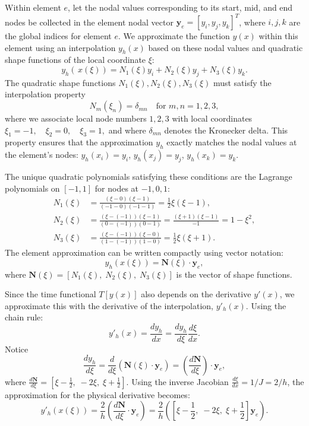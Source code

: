 \documentclass[11pt]{article}
\begin{document}
    Within element \(e\), let the nodal values corresponding to its start, mid, and end nodes be collected in the element nodal vector \( \mathbf{y}_{e} = \left[y_{i}, y_{j}, y_k\right]^{T}\), where \(i, j, k\) are the global indices for element \(e\). We approximate the function \( y(x) \) within this element using an interpolation \( y_h (x) \) based on these nodal values and quadratic shape functions of the local coordinate \( \xi \):
    \[
        y_h \left(\,x(\xi) \right) =  N_{1}(\xi) y_{i} + N_{2}(\xi) y_{j} + N_{3}(\xi) y_k.
    \]
    The quadratic shape functions \( N_1(\xi), N_2(\xi), N_3(\xi) \) must satisfy the interpolation property
    \[
        N_m(\xi_n) = \delta_{mn} \quad \text{for } m, n = 1, 2, 3,
    \]
    where we associate local node numbers $1, 2, 3$ with local coordinates
    \( \xi_1 = -1, \quad \xi_2 = 0, \quad \xi_3 = 1, \)
    and where \(\delta_{mn}\) denotes the Kronecker delta. This property ensures that the approximation \(y_h\) exactly matches the nodal values at the element's nodes: \( y_h(x_i) = y_i\), \( y_h(x_j) = y_j\), \( y_h(x_k) = y_k \).
    
    The unique quadratic polynomials satisfying these conditions are the Lagrange polynomials on \([-1, 1]\) for nodes at \(-1, 0, 1\):
    \[
    \begin{aligned}
        N_1(\xi) &= \frac{(\xi - 0)(\xi - 1)}{(-1 - 0)(-1 - 1)} = \frac{1}{2}\xi(\xi-1), \\
        N_2(\xi) &= \frac{(\xi - (-1))(\xi - 1)}{(0 - (-1))(0 - 1)} = \frac{(\xi+1)(\xi-1)}{-1} = 1 - \xi^2 ,\\
        N_3(\xi) &= \frac{(\xi - (-1))(\xi - 0)}{(1 - (-1))(1 - 0)} = \frac{1}{2}\xi(\xi+1).
    \end{aligned}
    \]
    The element approximation can be written compactly using vector notation:
    \begin{equation}
        y_h\left(x(\xi)\right) = \mathbf{N}(\xi) \cdot \mathbf{y}_e, \label{eq:yh}
    \end{equation}
    where \( \mathbf{N}(\xi) = [N_1(\xi), \; N_2(\xi), \; N_3(\xi)] \) is the vector of shape functions.
    
    Since the time functional \( T[y(x)] \) also depends on the derivative \( y'(x) \), we approximate this with the derivative of the interpolation, \( y'_h (x) \). Using the chain rule:
    \begin{equation*}
        y'_h (x) = \frac{dy_h}{dx}  = \frac{dy_h}{d\xi} \frac{d\xi}{dx}. 
    \end{equation*}
    Notice
    \[
        \frac{dy_h}{d\xi} = \frac{d}{d\xi} (\mathbf{N}(\xi) \cdot \mathbf{y}_e) = \left( \frac{d\mathbf{N}}{d\xi} \right) \cdot \mathbf{y}_e,
    \]
    where \( \frac{d\mathbf{N}}{d\xi} = \left[ \xi - \frac{1}{2},\; -2\xi,\; \xi + \frac{1}{2} \right] \).
    Using the inverse Jacobian \( \frac{d\xi}{dx} = 1/J = 2/h \), the approximation for the physical derivative becomes:
    \begin{equation}
        y'_h(x(\xi)) = \frac{2}{h} \left( \frac{d\mathbf{N}}{d\xi} \cdot \mathbf{y}_e \right)  = \frac{2}{h} \left( \left[ \xi - \frac{1}{2},\; -2\xi,\; \xi + \frac{1}{2} \right] \mathbf{y}_e \right). \label{eq:yhprime}
    \end{equation}
\end{document}
